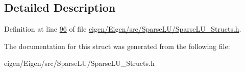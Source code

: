 \subsection{Detailed Description}


Definition at line \hyperlink{eigen_2_eigen_2src_2_sparse_l_u_2_sparse_l_u___structs_8h_source_l00096}{96} of file \hyperlink{eigen_2_eigen_2src_2_sparse_l_u_2_sparse_l_u___structs_8h_source}{eigen/\+Eigen/src/\+Sparse\+L\+U/\+Sparse\+L\+U\+\_\+\+Structs.\+h}.



The documentation for this struct was generated from the following file\+:\begin{DoxyCompactItemize}
\item 
eigen/\+Eigen/src/\+Sparse\+L\+U/\+Sparse\+L\+U\+\_\+\+Structs.\+h\end{DoxyCompactItemize}
